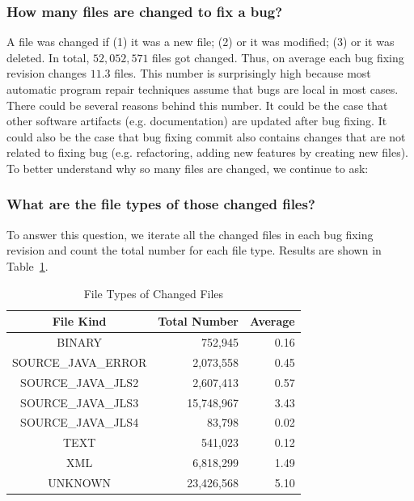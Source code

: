 \documentclass{sig-alternate-05-2015}
\begin{document}
\subsubsection*{How many files are changed to fix a bug?} \vspace{-0.3em} 

A file was changed if (1) it was a new file; (2) or it was modified; (3) or it
was deleted. In total, $52,052,571$ files got changed. Thus, on average each bug
fixing revision changes $11.3$ files.  This number is surprisingly high because
most automatic program repair techniques assume that bugs are local in most
cases. There could be several reasons behind this number. It could be the case
that other software artifacts (e.g.  documentation) are updated after bug
fixing. It could also be the case that bug fixing commit also contains changes
that are not related to fixing bug (e.g. refactoring, adding new features by
creating new files). To better understand why so many files are changed, we
continue to ask:

\subsubsection*{What are the file types of those changed files?} \vspace{-0.3em}

To answer this question, we iterate all the changed files in each bug fixing
revision and count the total number for each file type. Results are shown in
Table~\ref{tbl:fileType}.

\begin{table}
\centering
  \begin{tabular}{| c | r | r |}
  \hline
  File Kind & Total Number & Average \\ \hline \hline
  BINARY & 752,945 & 0.16 \\ \hline
  SOURCE\_JAVA\_ERROR & 2,073,558 & 0.45 \\ \hline
  SOURCE\_JAVA\_JLS2 & 2,607,413 & 0.57 \\ \hline
  SOURCE\_JAVA\_JLS3 & 15,748,967 & 3.43 \\ \hline
  SOURCE\_JAVA\_JLS4 & 83,798 & 0.02 \\ \hline
  TEXT & 541,023 & 0.12 \\ \hline
  XML & 6,818,299 & 1.49 \\ \hline
  UNKNOWN & 23,426,568 & 5.10 \\ \hline
  \end{tabular}
  \caption{File Types of Changed Files}
  \label{tbl:fileType}
\end{table}
\end{document}
